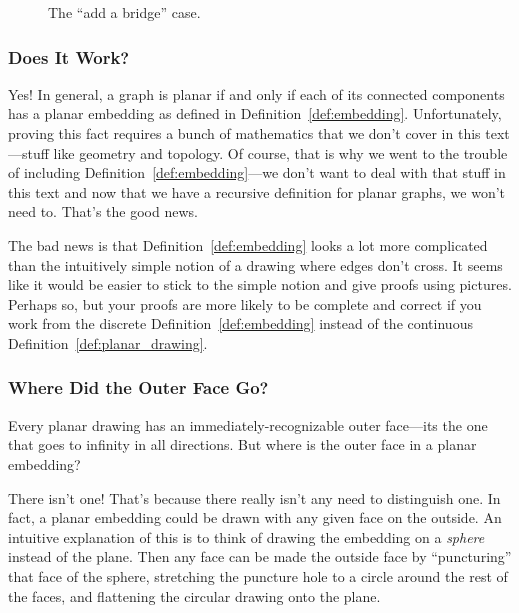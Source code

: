 \begin{definition}
\begin{figure}


\caption{The ``add a bridge'' case.}
\label{fig:add-bridge}
\end{figure}

\end{definition}

\subsubsection{Does It Work?}

Yes!  In general, a graph is planar if and only if each of its
connected components has a planar embedding as defined in
Definition~\ref{def:embedding}.  Unfortunately, proving this fact
requires a bunch of mathematics that we don't cover in this
text---stuff like geometry and topology.  Of course, that is why we
went to the trouble of including Definition~\ref{def:embedding}---we
don't want to deal with that stuff in this text and now that we have a
recursive definition for planar graphs, we won't need to.  That's the
good news.

The bad news is that Definition~\ref{def:embedding} looks a lot more
complicated than the intuitively simple notion of a drawing where
edges don't cross.  It seems like it would be easier to stick to the
simple notion and give proofs using pictures.  Perhaps so, but your
proofs are more likely to be complete and correct if you work from the
discrete Definition~\ref{def:embedding} instead of the continuous
Definition~\ref{def:planar_drawing}.

\subsubsection{Where Did the Outer Face Go?}

Every planar drawing has an immediately-recognizable outer face---its
the one that goes to infinity in all directions.  But where is the
outer face in a planar embedding?

There isn't one!  That's because there really isn't any need to
distinguish one.  In fact, a planar embedding could be drawn with any
given face on the outside.  An intuitive explanation of this is to
think of drawing the embedding on a \emph{sphere} instead of the
plane.  Then any face can be made the outside face by ``puncturing''
that face of the sphere, stretching the puncture hole to a circle
around the rest of the faces, and flattening the circular drawing onto
the plane.


